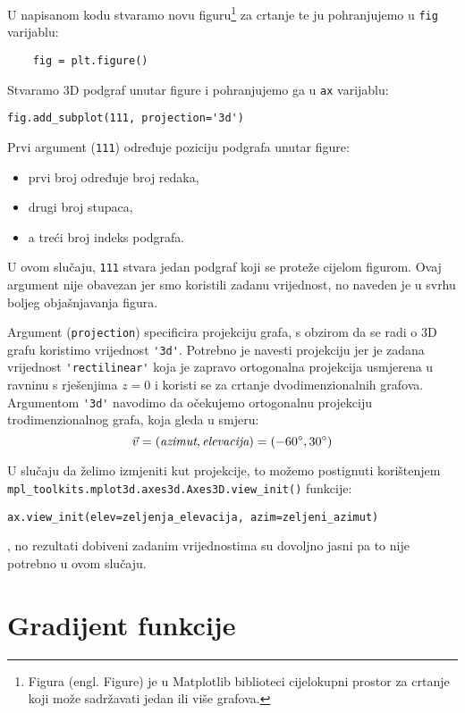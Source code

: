 U napisanom kodu stvaramo novu figuru\footnote{Figura (engl. Figure) je u Matplotlib biblioteci cijelokupni prostor za crtanje koji može sadržavati jedan ili više grafova.} za crtanje
te ju pohranjujemo u \verb|fig| varijablu:
\begin{verbatim}
    fig = plt.figure()
\end{verbatim}

Stvaramo 3D podgraf unutar figure i pohranjujemo ga u \verb|ax| varijablu:

\begin{verbatim}
fig.add_subplot(111, projection='3d')
\end{verbatim} 

Prvi argument (\verb|111|) određuje poziciju podgrafa unutar figure:
\begin{itemize}
    \item prvi broj određuje broj redaka,
    \item drugi broj stupaca,
    \item a treći broj indeks podgrafa.
\end{itemize}
U ovom slučaju, \verb|111| stvara jedan podgraf koji se proteže cijelom figurom. Ovaj argument nije obavezan jer smo koristili zadanu vrijednost, no naveden je u svrhu boljeg objašnjavanja figura.

Argument (\verb|projection|) specificira projekciju grafa, s obzirom da se radi o 3D grafu koristimo vrijednost \verb|'3d'|.
Potrebno je navesti projekciju jer je zadana vrijednost \verb|'rectilinear'| koja je zapravo ortogonalna projekcija usmjerena u ravninu s rješenjima $z = 0$ i koristi se za crtanje dvodimenzionalnih grafova.
Argumentom \verb|'3d'| navodimo da očekujemo ortogonalnu projekciju trodimenzionalnog grafa, koja gleda u smjeru:
$$
\vec{v} = (\text{\it azimut}, \text{\it elevacija}) = (-60^{\circ}, 30^{\circ})
$$

U slučaju da želimo izmjeniti kut projekcije, to možemo postignuti korištenjem \verb|mpl_toolkits.mplot3d.axes3d.Axes3D.view_init()| funkcije:
\begin{verbatim}
ax.view_init(elev=zeljenja_elevacija, azim=zeljeni_azimut)
\end{verbatim}
, no rezultati dobiveni zadanim vrijednostima su dovoljno jasni pa to nije potrebno u ovom slučaju.

\section{Gradijent funkcije}

